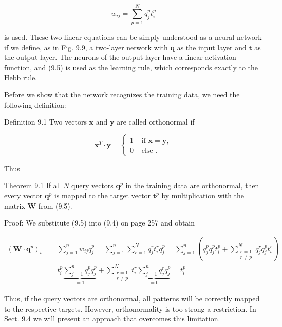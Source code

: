 \documentclass[10pt]{article}
\begin{document}
\begin{equation*}
w_{i j}=\sum_{p=1}^{N} q_{j}^{p} t_{i}^{p} \tag{9.5}
\end{equation*}


is used. These two linear equations can be simply understood as a neural network if we define, as in Fig. 9.9, a two-layer network with $\boldsymbol{q}$ as the input layer and $\boldsymbol{t}$ as the output layer. The neurons of the output layer have a linear activation function, and (9.5) is used as the learning rule, which corresponds exactly to the Hebb rule.

Before we show that the network recognizes the training data, we need the following definition:

Definition 9.1 Two vectors $\boldsymbol{x}$ and $\boldsymbol{y}$ are called orthonormal if

$$
\boldsymbol{x}^{T} \cdot \boldsymbol{y}= \begin{cases}1 & \text { if } \boldsymbol{x}=\boldsymbol{y}, \\ 0 & \text { else } .\end{cases}
$$

Thus

Theorem 9.1 If all $N$ query vectors $\boldsymbol{q}^{p}$ in the training data are orthonormal, then every vector $\boldsymbol{q}^{p}$ is mapped to the target vector $\boldsymbol{t}^{p}$ by multiplication with the matrix $\boldsymbol{W}$ from (9.5).

Proof: We substitute (9.5) into (9.4) on page 257 and obtain

$$
\begin{aligned}
\left(\boldsymbol{W} \cdot \boldsymbol{q}^{p}\right)_{i} & =\sum_{j=1}^{n} w_{i j} q_{j}^{p}=\sum_{j=1}^{n} \sum_{r=1}^{N} q_{j}^{r} t_{i}^{r} q_{j}^{p}=\sum_{j=1}^{n}\left(q_{j}^{p} q_{j}^{p} t_{i}^{p}+\sum_{\substack{r=1 \\
r \neq p}}^{N} q_{j}^{r} q_{j}^{p} t_{i}^{r}\right) \\
& =t_{i}^{p} \underbrace{\sum_{j=1}^{n} q_{j}^{p} q_{j}^{p}}_{=1}+\sum_{\substack{r=1 \\
r \neq p}}^{N} t_{i}^{r} \underbrace{\sum_{j=1}^{n} q_{j}^{r} q_{j}^{p}}_{=0}=t_{i}^{p}
\end{aligned}
$$

Thus, if the query vectors are orthonormal, all patterns will be correctly mapped to the respective targets. However, orthonormality is too strong a restriction. In Sect. 9.4 we will present an approach that overcomes this limitation.
\end{document}
